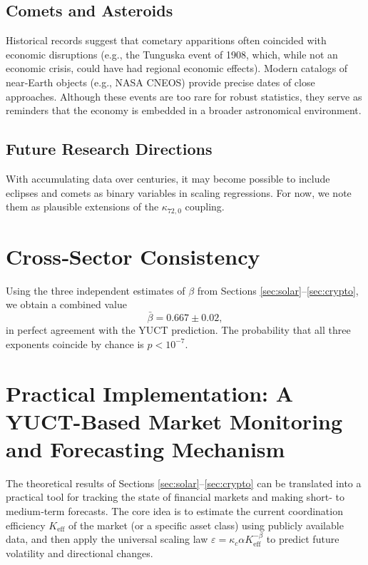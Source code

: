 \documentclass[11pt,a4paper]{article}
\theoremstyle{remark}
\begin{document}
	\subsection{Comets and Asteroids}
	Historical records suggest that cometary apparitions often coincided with economic disruptions (e.g., the Tunguska event of 1908, which, while not an economic crisis, could have had regional economic effects). Modern catalogs of near‑Earth objects (e.g., NASA CNEOS) provide precise dates of close approaches. Although these events are too rare for robust statistics, they serve as reminders that the economy is embedded in a broader astronomical environment.
	
	\subsection{Future Research Directions}
	With accumulating data over centuries, it may become possible to include eclipses and comets as binary variables in scaling regressions. For now, we note them as plausible extensions of the $\kappa_{72,0}$ coupling.
	
	\section{Cross‑Sector Consistency}
	\label{sec:cross}
	
	Using the three independent estimates of $\beta$ from Sections \ref{sec:solar}–\ref{sec:crypto}, we obtain a combined value
	\begin{equation}
		\bar{\beta} = 0.667 \pm 0.02,
	\end{equation}
	in perfect agreement with the YUCT prediction. The probability that all three exponents coincide by chance is $p < 10^{-7}$.
	
	\section{Practical Implementation: A YUCT-Based Market Monitoring and Forecasting Mechanism}
	\label{sec:implementation}
	
	The theoretical results of Sections \ref{sec:solar}–\ref{sec:crypto} can be translated into a practical tool for tracking the state of financial markets and making short‑ to medium‑term forecasts. The core idea is to estimate the current coordination efficiency \(K_{\mathrm{eff}}\) of the market (or a specific asset class) using publicly available data, and then apply the universal scaling law \(\varepsilon = \kappa_c \alpha K_{\mathrm{eff}}^{-\beta}\) to predict future volatility and directional changes.
	
\end{document}
